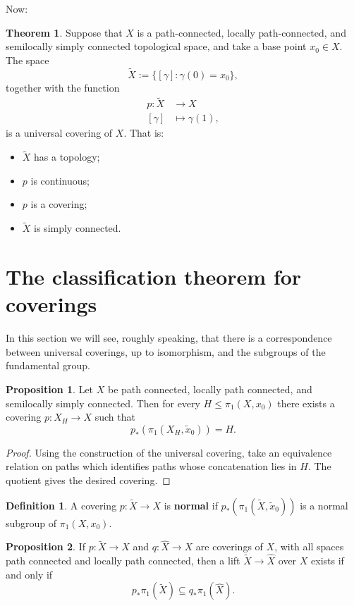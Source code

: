 \documentclass{book}
\theoremstyle{definition}
\newtheorem*{defn}{Definition}
\newtheorem*{teo}{Theorem}
\newtheorem*{prop}{Proposition}
\begin{document}
Now:

\begin{teo}
Suppose that $X$ is a path-connected, locally path-connected,
and semilocally simply connected topological space, and take
a base point $x_0\in X$. The space
$$
\tilde X:=\{[\gamma]:\gamma(0)=x_0\},
$$
together with the function
$$
\begin{aligned}
p:\tilde X&\to X\\
[\gamma]&\mapsto\gamma(1),
\end{aligned}
$$
is a universal covering of $X$. That is:
\begin{itemize}
\item $\tilde X$ has a topology;
\item $p$ is continuous;
\item $p$ is a covering;
\item $\tilde X$ is simply connected.
\end{itemize}
\end{teo}

\section{The classification theorem for coverings}

In this section we will see, roughly speaking, that there is
a correspondence between universal coverings, up to
isomorphism, and the subgroups of the fundamental group.

\begin{prop}
Let $X$ be path connected, locally path connected, and
semilocally simply connected. Then for every
$H\leq\pi_1(X,x_0)$ there exists a covering $p:X_H\to X$
such that
$$
p_*\left(\pi_1(X_H,\tilde x_0)\right)=H.
$$
\end{prop}

\begin{proof}
Using the construction of the universal covering, take an
equivalence relation on paths which identifies paths whose
concatenation lies in $H$. The quotient gives the desired
covering.
\end{proof}

\begin{defn}
A covering $p:\tilde X\to X$ is \textbf{normal} if
$p_*(\pi_1(\tilde X,\tilde x_0))$ is a normal subgroup of
$\pi_1(X,x_0)$.
\end{defn}

\begin{prop}
If $p:\tilde X\to X$ and $q:\hat X\to X$ are coverings of
$X$, with all spaces path connected and locally path
connected, then a lift $\tilde X\to\hat X$ over $X$ exists if
and only if
$$
p_*\pi_1(\tilde X)\subseteq q_*\pi_1(\hat X).
$$
\end{prop}
\end{document}
